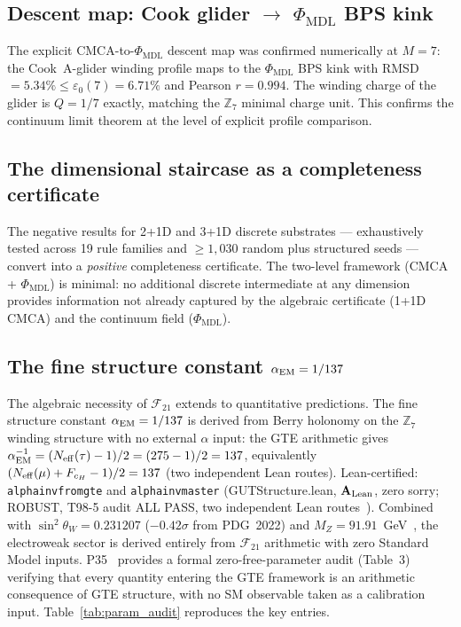 \documentclass[11pt]{article}
\theoremstyle{remark}
\newcommand{\PHIMDL}{\Phi_{\mathrm{MDL}}}
\newcommand{\ZS}{\mathbb{Z}_7}
\newcommand{\lean}[1]{%
  \penalty-100
  \begingroup\def\_{\textunderscore\allowbreak}\texttt{#1}\endgroup}
\newcommand{\epsz}{\varepsilon_0}
\newcommand{\FTT}{\mathcal{F}_{21}}
\newcommand{\CatAL}{\ensuremath{\textbf{A}_{\rm Lean}}}
\begin{document}
\subsection{Descent map: Cook glider \texorpdfstring{$\to$ $\PHIMDL$}{to Phi-MDL} BPS kink}

The explicit CMCA-to-$\PHIMDL$ descent map was confirmed numerically at $M=7$:
the Cook~A-glider winding profile maps to the $\PHIMDL$ BPS kink with
RMSD $= 5.34\% \leq \epsz(7) = 6.71\%$ and Pearson $r = 0.994$.
The winding charge of the glider is $Q = 1/7$ exactly, matching the
$\ZS$ minimal charge unit.  This confirms the continuum limit theorem
at the level of explicit profile comparison.

\subsection{The dimensional staircase as a completeness certificate}

The negative results for 2+1D and 3+1D discrete substrates --- exhaustively
tested across 19 rule families and $\geq 1{,}030$ random plus structured seeds
--- convert into a \emph{positive} completeness certificate.  The two-level
framework (CMCA + $\PHIMDL$) is minimal: no additional discrete intermediate
at any dimension provides information not already captured by the algebraic
certificate (1+1D CMCA) and the continuum field ($\PHIMDL$).

\subsection{The fine structure constant \texorpdfstring{$\alpha_{\rm EM} = 1/137$}{alpha-EM = 1/137}}
\label{sec:alpha_em}

The algebraic necessity of $\FTT$ extends to quantitative predictions.
The fine structure constant $\alpha_{\rm EM} = 1/137$ is derived from
Berry holonomy on the $\ZS$ winding structure with no external $\alpha$ input:
the GTE arithmetic gives $\alpha_{\rm EM}^{-1} = (N_{\rm eff}(\tau) - 1)/2
= (275-1)/2 = 137$, equivalently $(N_{\rm eff}(\mu) + F_{c_H} - 1)/2 = 137$
(two independent Lean routes).
Lean-certified: \lean{alpha\_inv\_from\_gte} and \lean{alpha\_inv\_master}
(GUTStructure.lean, $\CatAL$, zero sorry; ROBUST, T98-5 audit ALL PASS,
two independent Lean routes~\cite{SpivackGTEUnification}).
Combined with $\sin^2\theta_W = 0.231207$ ($-0.42\sigma$ from PDG~2022) and
$M_Z = 91.91$~GeV~\cite{SpivackGTEUnification}, the electroweak sector is
derived entirely from $\FTT$ arithmetic with zero Standard Model inputs.
P35~\cite{SpivackGTEUnification} provides a formal zero-free-parameter audit
(Table~3) verifying that every quantity entering the GTE framework is an arithmetic
consequence of GTE structure, with no SM observable taken as a calibration input.
Table~\ref{tab:param_audit} reproduces the key entries.
\end{document}
